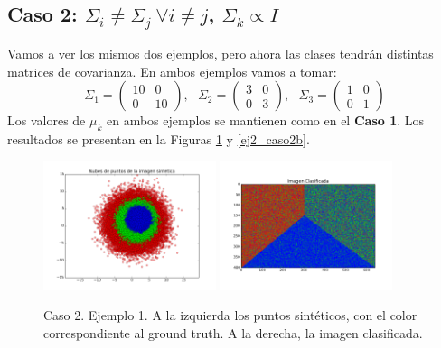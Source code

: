 \documentclass[a4paper,11pt]{article}
\begin{document}
\subsection*{Caso 2: $\Sigma_i \neq \Sigma_j \ \forall i\neq j$, $\Sigma_k\propto I$}
Vamos a ver los mismos dos ejemplos, pero ahora las clases tendrán distintas matrices de covarianza. En ambos ejemplos vamos a tomar:
$$\Sigma_1 = \begin{pmatrix}10 & 0\\ 0 & 10\end{pmatrix}, \ \ \ \Sigma_2 = \begin{pmatrix}3 & 0\\ 0 & 3\end{pmatrix}, \ \ \ \Sigma_3 = \begin{pmatrix}1 & 0\\ 0 & 1\end{pmatrix}$$
Los valores de $\mu_k$ en ambos ejemplos se mantienen como en el {\bf Caso 1}. Los resultados se presentan en la Figuras \ref{ej2_caso2a} y \ref{ej2_caso2b}.

\begin{figure}[h!]
\centering
\includegraphics[width=0.45\textwidth]{img/ej2-caso2a-puntos.png}
\includegraphics[width=0.45\textwidth]{img/ej2-caso2a-clfPhantom.png}
\caption{Caso 2. Ejemplo 1. A la izquierda los puntos sintéticos, con el color correspondiente al ground truth. A la derecha, la imagen clasificada.}
\label{ej2_caso2a}
\end{figure}
\end{document}
